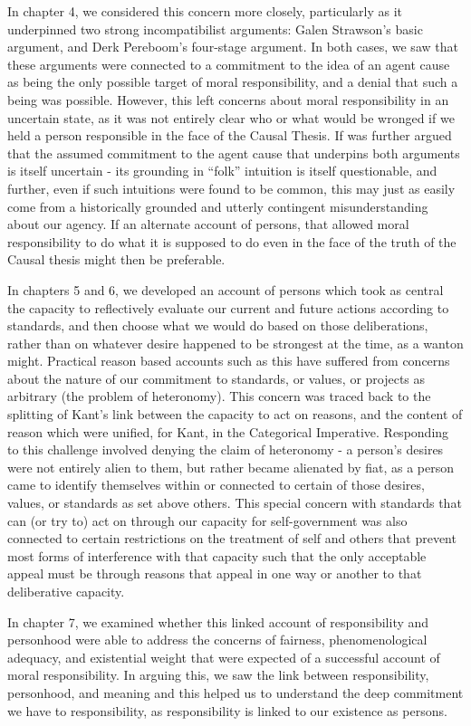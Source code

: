 \documentclass[phd,12pt,oneside,paper=letterpaper]{ubcthesis}
\begin{document}
In chapter 4, we considered this concern more closely, particularly as it underpinned two strong incompatibilist arguments: Galen Strawson's basic argument, and Derk Pereboom's four-stage argument. In both cases, we saw that these arguments were connected to a commitment to the idea of an agent cause as being the only possible target of moral responsibility, and a denial that such a being was possible. However, this left concerns about moral responsibility in an uncertain state, as it was not entirely clear who or what would be wronged if we held a person responsible in the face of the Causal Thesis. If was further argued that the assumed commitment to the agent cause that underpins both arguments is itself uncertain - its grounding in ``folk'' intuition is itself questionable, and further, even if such intuitions were found to be common, this may just as easily come from a historically grounded and utterly contingent misunderstanding about our agency. If an alternate account of persons, that allowed moral responsibility to do what it is supposed to do even in the face of the truth of the Causal thesis might then be preferable. 

In chapters 5 and 6, we developed an account of persons which took as central the capacity to reflectively evaluate our current and future actions according to standards, and then choose what we would do based on those deliberations, rather than on whatever desire happened to be strongest at the time, as a wanton might. Practical reason based accounts such as this have suffered from concerns about the nature of our commitment to standards, or values, or projects as arbitrary (the problem of heteronomy). This concern was traced back to the splitting of Kant's link between the capacity to act on reasons, and the content of reason which were unified, for Kant, in the Categorical Imperative. Responding to this challenge involved denying the claim of heteronomy - a person's desires were not entirely alien to them, but rather became alienated by fiat, as a person came to identify themselves within or connected to certain of those desires, values, or standards as set above others. This special concern with standards that can (or try to) act on through our capacity for self-government was also connected to certain restrictions on the treatment of self and others that prevent most forms of interference with that capacity such that the only acceptable appeal must be through reasons that appeal in one way or another to that deliberative capacity. 

In chapter 7, we examined whether this linked account of responsibility and personhood were able to address the concerns of fairness, phenomenological adequacy, and existential weight that were expected of a successful account of moral responsibility. In arguing this, we saw the link between responsibility, personhood, and meaning and this helped us to understand the deep commitment we have to responsibility, as responsibility is linked to our existence as persons. 




\end{document}
